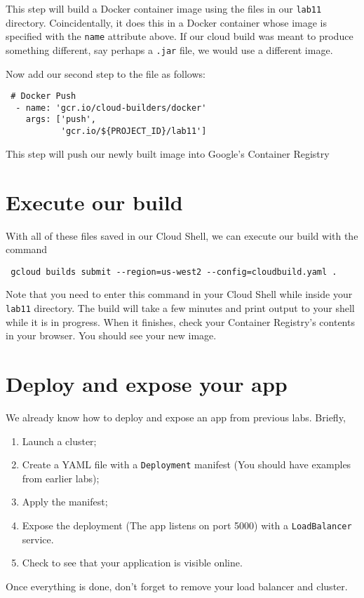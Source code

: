 \documentclass{article}
\begin{document}
This step will build a Docker container image using the files in our \texttt{lab11} directory. Coincidentally, it does this in a Docker container whose image is specified with the \texttt{name} attribute above. If our cloud build was meant to produce something different, say perhaps a \texttt{.jar} file, we would use a different image.

Now add our second step to the file as follows:

\begin{verbatim}
 # Docker Push
  - name: 'gcr.io/cloud-builders/docker'
    args: ['push', 
           'gcr.io/${PROJECT_ID}/lab11']
\end{verbatim}

This step will push our newly built image into Google's Container Registry

\section{Execute our build}
With all of these files saved in our Cloud Shell, we can execute our build with the command

\begin{verbatim}
 gcloud builds submit --region=us-west2 --config=cloudbuild.yaml .
\end{verbatim}

Note that you need to enter this command in your Cloud Shell while inside your \texttt{lab11} directory. The build will take a few minutes and print output to your shell while it is in progress. When it finishes, check your Container Registry's contents in your browser. You should see your new image.

\section{Deploy and expose your app}
We already know how to deploy and expose an app from previous labs. Briefly,

\begin{enumerate}
  \item Launch a cluster;
  \item Create a YAML file with a \texttt{Deployment} manifest (You should have examples from earlier labs);
  \item Apply the manifest;
 \item Expose the deployment (The app listens on port 5000) with a \texttt{LoadBalancer} service.
   \item Check to see that your application is visible online.
 \end{enumerate}
 
 Once everything is done, don't forget to remove your load balancer and cluster.  
 
\end{document}
